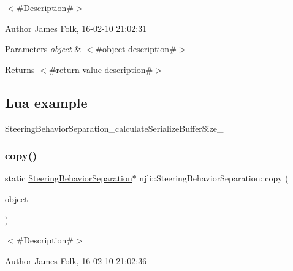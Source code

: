 $<$\#\+Description\#$>$ 

\begin{DoxyAuthor}{Author}
James Folk, 16-\/02-\/10 21\+:02\+:31
\end{DoxyAuthor}

\begin{DoxyParams}{Parameters}
{\em object} & $<$\#object description\#$>$\\
\hline
\end{DoxyParams}
\begin{DoxyReturn}{Returns}
$<$\#return value description\#$>$
\end{DoxyReturn}
\hypertarget{classnjli_1_1_steering_behavior_wander_ex1}{}\subsection{Lua example}\label{classnjli_1_1_steering_behavior_wander_ex1}

\begin{DoxyCodeInclude}
\end{DoxyCodeInclude}
Steering\+Behavior\+Separation\+\_\+calculate\+Serialize\+Buffer\+Size\+\_\+ \mbox{\label{classnjli_1_1_steering_behavior_separation_a8156a2c0a0ad40dba25f82d3cd1afea9}} 
\subsubsection{\texorpdfstring{copy()}{copy()}}
{\footnotesize\ttfamily static \mbox{\hyperlink{classnjli_1_1_steering_behavior_separation}{Steering\+Behavior\+Separation}}$\ast$ njli\+::\+Steering\+Behavior\+Separation\+::copy (\begin{DoxyParamCaption}\item[{const \mbox{\hyperlink{classnjli_1_1_steering_behavior_separation}{Steering\+Behavior\+Separation}} \&}]{object }\end{DoxyParamCaption})\hspace{0.3cm}{\ttfamily [static]}}



$<$\#\+Description\#$>$ 

\begin{DoxyAuthor}{Author}
James Folk, 16-\/02-\/10 21\+:02\+:36
\end{DoxyAuthor}

